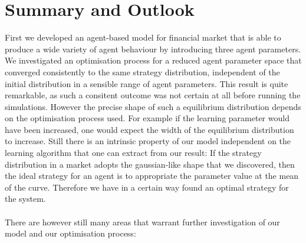 \documentclass[11pt]{article}
\begin{document}
\section{Summary and Outlook}
First we developed an agent-based model for financial market that is able to produce a wide variety of agent behaviour by introducing three agent parameters. We investigated an optimisation process for a reduced agent parameter space that converged consistently to the same strategy distribution, independent of the initial distribution in a sensible range of agent parameters. This result is quite remarkable, as such a consitent outcome was not certain at all before running the simulations. However the precise shape of such a equilibrium distribution depends on the optimisation process used. For example if the learning parameter would have been increased, one would expect the width of the equilibrium distribution to increase. Still there is an intrinsic property of our model independent on the learning algorithm that one can extract from our result: If the strategy distribution in a market adopts the gaussian-like shape that we discovered, then the ideal strategy for an agent is to appropriate the parameter value at the mean of the curve. Therefore we have in a certain way found an optimal strategy for the system. \\
\hfill \\
There are however still many areas that warrant further investigation of our model and our optimisation process:
\end{document}
